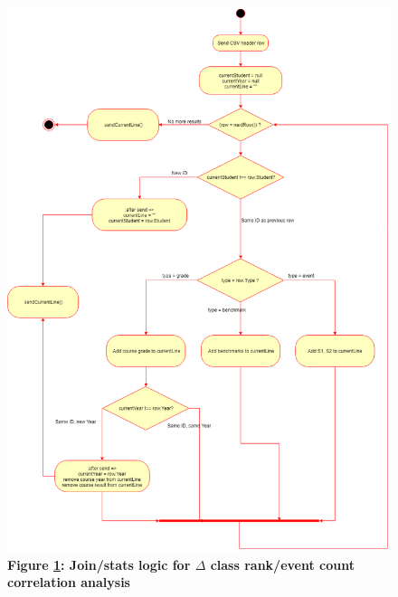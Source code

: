 \begin{figure}[H]
    \centering
    \begin{mdframed}
        \centering
        \includegraphics[scale=0.4]{./resources/figures/fig-listfn-correlation-events.png}
    \end{mdframed}
    \caption[$\Delta$ class rank/event count correlation list function]{\textbf{Figure \ref{fig-listfn-correlation-events}: Join/stats logic for $\Delta$ class rank/event count correlation analysis}}
    \label{fig-listfn-correlation-events}
\end{figure}
